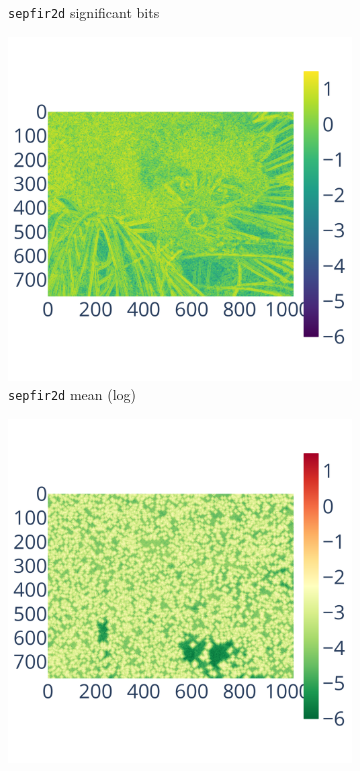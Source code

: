 \begin{figure}
\begin{subfigure}{0.3\linewidth}
        \caption{\centering\texttt{sepfir2d} significant bits}
        \label{fig:bspline_bisplev_sig}
    \end{subfigure}
    \begin{subfigure}{0.3\linewidth}
        \includegraphics[width=\linewidth]{figure/bspline/bspline_mean_log.pdf}
        \caption{\centering\texttt{sepfir2d} mean (log)}
        \label{fig:bspline_bisplev_mean}
    \end{subfigure}
    \begin{subfigure}{0.3\linewidth}
        \includegraphics[width=\linewidth]{figure/bspline/bspline_std_log.pdf}

\end{subfigure}
\end{figure}
